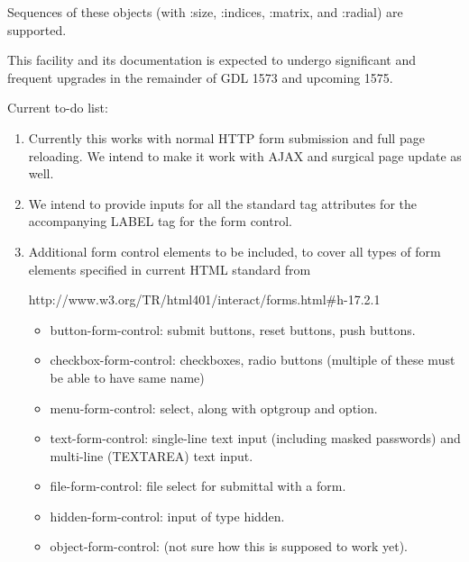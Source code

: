 \documentclass [11pt]{book}
\begin{document}
\begin{itemize}
\begin{description}
Sequences of these objects (with :size, :indices, :matrix, and :radial) are supported.

This facility and its documentation is expected to undergo significant and frequent upgrades in the remainder of GDL 1573 and upcoming 1575.

Current to-do list:



\begin{enumerate}

\item 
Currently this works with normal HTTP form submission and full page reloading. 
We intend to make it work with AJAX and surgical page update as well.



\item 
We intend to provide inputs for all the standard tag attributes for the accompanying LABEL tag for the form control.



\item 
Additional form control elements to be included, to cover all types of form elements specified in current HTML standard from

    http://www.w3.org/TR/html401/interact/forms.html\#h-17.2.1

    

\begin{itemize}

\item button-form-control: submit buttons, reset buttons, push buttons.
      

\item checkbox-form-control: checkboxes, radio buttons (multiple of these must be able to have same name)
      

\item menu-form-control: select, along with optgroup and option.
      

\item text-form-control: single-line text input (including masked passwords) and multi-line (TEXTAREA) text input.
      

\item file-form-control: file select for submittal with a form.
      

\item hidden-form-control: input of type hidden.
      

\item object-form-control: (not sure how this is supposed to work yet).
    


\end{itemize}
\end{enumerate}
\end{description}
\end{itemize}
\end{document}
